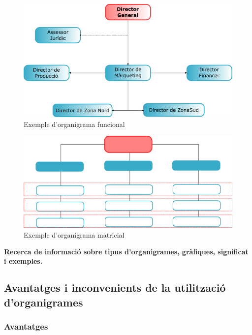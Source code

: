\documentclass[
]{book}
\begin{document}
\begin{figure}

{\centering \includegraphics[width=0.8\linewidth]{organigrama} 

}

\caption{Exemple d'organigrama funcional}\label{fig:unnamed-chunk-1}
\end{figure}

\vspace{3cm}

\begin{figure}

{\centering \includegraphics[width=0.8\linewidth]{matricial} 

}

\caption{Exemple d'organigrama matricial}\label{fig:unnamed-chunk-2}
\end{figure}

\textbf{Recerca de informació sobre tipus d'organigrames, gràfiques, significat i exemples.}

\hypertarget{avantatges-i-inconvenients-de-la-utilitzaciuxf3-dorganigrames}{%
\subsection{Avantatges i inconvenients de la utilització d'organigrames}\label{avantatges-i-inconvenients-de-la-utilitzaciuxf3-dorganigrames}}

\hypertarget{avantatges}{%
\subsubsection{Avantatges}\label{avantatges}}
\end{document}
